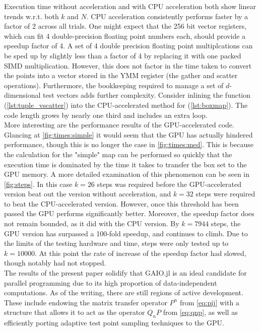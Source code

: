 Execution time without acceleration and with CPU acceleration both show linear trends 
w.r.t. both $k$ and $N$. CPU acceleration consistently performs faster by a factor of 2 
across all trials. One might expect that the 256 bit vector registers, which can fit 4 
double-precision floating point numbers each, should provide a speedup factor of 4. 
A set of 4 double precision floating point multiplcations can be sped up by slightly less 
than a factor of 4 by replacing it with one packed SIMD multiplication. However, this does 
not factor in the time taken to convert the points into a vector stored in the YMM 
register (the gather and scatter operations). Furthermore, the bookkeeping required to 
manage a set of $d$-dimensional test vectors adds further complexity. Consider inlining 
the function  (\autoref{lst:tuple_vscatter}) into the 
CPU-accelerated method for  (\autoref{lst:boxmap}). The code length grows 
by nearly one third and includes an extra  loop. \\

More interesting are the performance results of the GPU-accelerated code. Glancing at 
\autoref{fig:times:simple} it would seem that the GPU has actually hindered 
performance, though this is no longer the case in \autoref{fig:times:med}. This is 
because the calculation for the "simple" map can be performed so quickly that the 
execution time is dominated by the time it takes to transfer the box set to the GPU 
memory. A more detailed examination of this phenomenon can be seen in 
\autoref{fig:steps}. In this case $k = 26$ steps was required before the 
GPU-accelerated version beat out the version without acceleration, and $k = 32$ steps were 
required to beat the CPU-accelerated version. However, once this threshold has been 
passed the GPU performs significantly better. Moreover, the speedup factor does not remain 
bounded, as it did with the CPU version. By $k = 7944$ steps, the GPU version has 
surpassed a 100-fold speedup, and continues to climb. Due to the limits of the testing 
hardware and time, steps were only tested up to $k = 10000$. At this point the rate of 
increase of the speedup factor had slowed, though notably had not stopped. \\

The results of the present paper solidify that GAIO.jl is an ideal candidate for 
parallel programming due to its high proportion of data-independent computations. As of 
the writing, there are still regions of active development. These include endowing the 
matrix transfer operator $P^n$ from \autoref{eq:pij} with a structure that allows it to 
act as the operator $Q_n P$ from \autoref{eq:qnp}, as well as 
efficiently porting adaptive test point sampling techniques to the GPU. 

